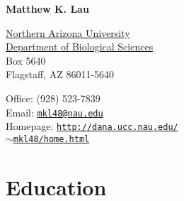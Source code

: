 \documentclass[letterpaper]{article}
\def\name{Matthew K. Lau}
\begin{document}
\centerline{\huge\bf \name}

\vspace{0.25in}
\begin{minipage}[t]{0.5\textwidth}
  \href{http://www.nau.edu/}{Northern Arizona University} \\
  \href{http://www.cefns.nau.edu/Academic/Biology/}{Department of Biological Sciences} \\
  Box 5640 \\
  Flagstaff, AZ 86011-5640 \\

\end{minipage}
\begin{minipage}[t]{0.5\textwidth}
  Office: (928) 523-7839 \\
  Email: \href{mailto:mkl48@nau.edu}{\tt mkl48@nau.edu} \\
  Homepage: \href{http://dana.ucc.nau.edu/~mkl48/bio/home.html}{\tt http://dana.ucc.nau.edu/} \\   \href{http://dana.ucc.nau.edu/~mkl48/bio/home.html}{\tt $\sim$mkl48/home.html} \\
\end{minipage}

\section*{Education}
\end{document}
